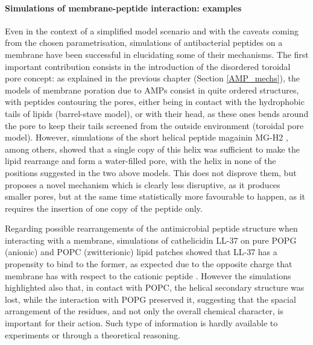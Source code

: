 \paragraph{Simulations of membrane-peptide interaction: examples} Even in the context of a simplified model scenario and with the caveats coming from the chosen parametrisation, simulations of antibacterial peptides on a membrane have been successful in elucidating some of their mechanisms.
%
The first important contribution consists in the introduction of the disordered toroidal pore concept: as explained in the previous chapter (Section \ref{AMP_mechs}), the models of membrane poration due to AMPs consist in quite ordered structures, with peptides contouring the pores, either being in contact with the hydrophobic tails of lipids (barrel-stave model), or with their head, as these ones bends around the pore to keep their tails screened from the outside environment (toroidal pore model). However, simulations of the short helical peptide magainin MG-H2 \cite{Leontiadou2006}, among others, showed that a single copy of this helix was sufficient to make the lipid rearrange and form a water-filled pore, with the helix in none of the positions suggested in the two above models. This does not disprove them, but proposes a novel mechanism which is clearly less disruptive, as it produces smaller pores, but at the same time statistically more favourable to happen, as it requires the insertion of one copy of the peptide only.

Regarding possible rearrangements of the antimicrobial peptide structure when interacting with a membrane, simulations of cathelicidin LL-37 on pure POPG (anionic) and POPC (zwitterionic) lipid patches showed that LL-37 has a propensity to bind to the former, as expected due to the opposite charge that membrane has with respect to the cationic peptide \cite{Zhao2018}. However the simulations highlighted also that, in contact with POPC, the helical secondary structure was lost, while the interaction with POPG preserved it, suggesting that the spacial arrangement of the residues, and not only the overall chemical character, is important for their action. Such type of information is hardly available to experiments or through a theoretical reasoning.


